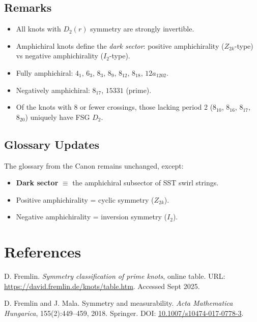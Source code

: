 \documentclass{article}
\begin{document}
    \subsection{Remarks}
        \begin{itemize}
        \item All knots with $D_2(r)$ symmetry are strongly invertible.
        \item Amphichiral knots define the \emph{dark sector}: positive amphichirality ($Z_{2k}$-type) vs negative amphichirality ($I_2$-type).
        \item Fully amphichiral: $4_1$, $6_3$, $8_3$, $8_9$, $8_{12}$, $8_{18}$, $12a_{1202}$.
        \item Negatively amphichiral: $8_{17}$, $15331$ (prime).
        \item Of the knots with 8 or fewer crossings, those lacking period 2 ($8_{10}$, $8_{16}$, $8_{17}$, $8_{20}$) uniquely have FSG $D_2$.
        \end{itemize}

    \subsection{Glossary Updates}
        The glossary from the Canon remains unchanged, except:
        \begin{itemize}
        \item \textbf{Dark sector} $\equiv$ the amphichiral subsector of SST swirl strings.
        \item Positive amphichirality = cyclic symmetry ($Z_{2k}$).
        \item Negative amphichirality = inversion symmetry ($I_2$).
        \end{itemize}

\section*{References}
    
    \begin{thebibliography}{99}
    D. Fremlin. \emph{Symmetry classification of prime knots}, online table.
    URL: \url{https://david.fremlin.de/knots/table.htm}. Accessed Sept 2025.

    D. Fremlin and J. Mala. Symmetry and measurability.
    \emph{Acta Mathematica Hungarica}, 155(2):449--459, 2018.
    Springer. DOI: \href{https://doi.org/10.1007/s10474-017-0778-3}{10.1007/s10474-017-0778-3}.
    \end{thebibliography}
\end{document}
